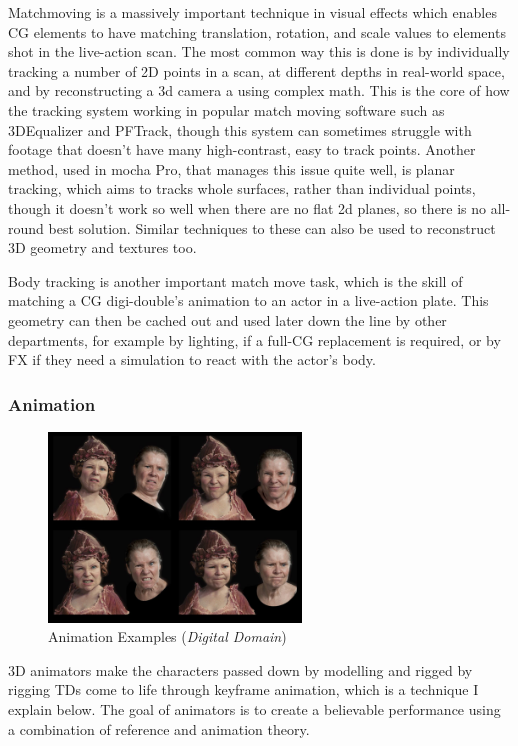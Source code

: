 Matchmoving is a massively important technique in visual effects which enables CG elements to have matching translation, rotation, and scale values to elements shot in the live-action scan. The most common way this is done is by individually tracking a number of 2D points in a scan, at different depths in real-world space, and by reconstructing a 3d camera a using complex math. This is the core of how the tracking system working in popular match moving software such as 3DEqualizer and PFTrack, though this system can sometimes struggle with footage that doesn't have many high-contrast, easy to track points. Another method, used in mocha Pro, that manages this issue quite well, is planar tracking, which aims to tracks whole surfaces, rather than individual points, though it doesn't work so well when there are no flat 2d planes, so there is no all-round best solution. Similar techniques to these can also be used to reconstruct 3D geometry and textures too.

Body tracking is another important match move task, which is the skill of matching a CG digi-double's animation to an actor in a live-action plate. This geometry can then be cached out and used later down the line by other departments, for example by lighting, if a full-CG replacement is required, or by FX if they need a simulation to react with the actor's body.

\hypertarget{animation}{%
\subsubsection{Animation}\label{animation}}

\begin{figure}
\includegraphics[width=0.6\textwidth,height=\textheight]{./images/anim_poses.png}
\caption{Animation Examples (\emph{Digital Domain})}
\end{figure}

3D animators make the characters passed down by modelling and rigged by rigging TDs come to life through keyframe animation, which is a technique I explain below. The goal of animators is to create a believable performance using a combination of reference and animation theory.

